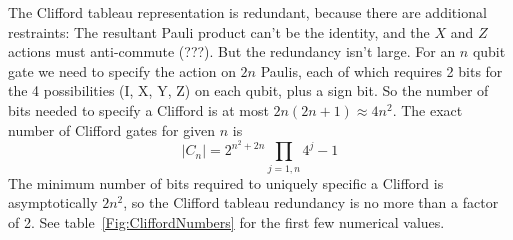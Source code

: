 The Clifford tableau representation is redundant, because there are additional restraints: The resultant Pauli product can't be the identity, and the $X$ and $Z$ actions must anti-commute (???). But the redundancy isn't large. For an $n$ qubit gate we need to specify the action on $2n$ Paulis, each of which requires 2 bits for the 4 possibilities (I, X, Y, Z) on each qubit, plus a sign bit. So the number of bits needed to specify a Clifford is at most $2n(2n+1)\approx 4n^2$. 
The exact number of Clifford gates for given $n$ is
\[
|C_n| = 2^{n^2+2n} \prod_{j=1,n} 4^j-1
\]
The minimum number of bits required to uniquely specific a Clifford is asymptotically $2n^2$, so the Clifford tableau redundancy is no more than a factor of 2. See table~\ref{Fig:CliffordNumbers} for the first few numerical values.

%
%
%
%
%
